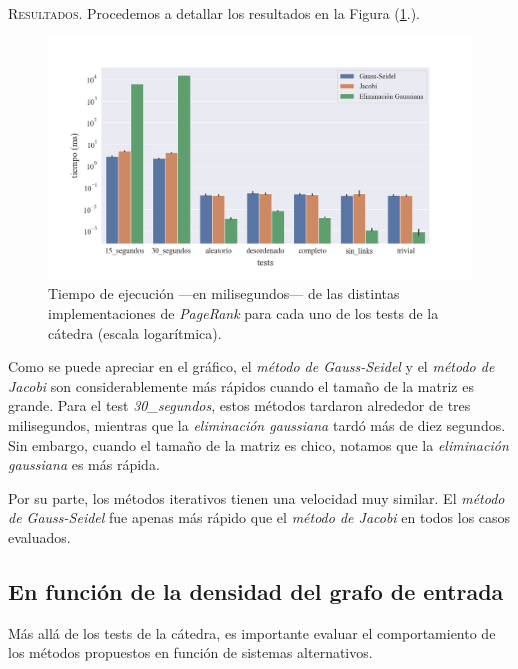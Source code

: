 \vspace{1.5em}
\noindent \textsc{Resultados}. Procedemos a detallar los resultados en la Figura (\ref{tiempo_ej}.). 

\begin{figure}[!htbp]
    \centering
    \includegraphics[width=.9\textwidth, trim=0 30 0 30]{files/src/.media/tiempo-ejecucion.png}
    \caption{Tiempo de ejecución ---en milisegundos--- de las distintas implementaciones de \textit{PageRank} para cada uno de los tests de la cátedra (escala logarítmica).} \label{tiempo_ej}
\end{figure}


\vspace{1em}
Como se puede apreciar en el gráfico, el \textit{método de Gauss-Seidel} y el \textit{método de Jacobi} son considerablemente más rápidos cuando el tamaño de la matriz es grande. Para el test \textit{30\_segundos}, estos métodos tardaron alrededor de tres milisegundos, mientras que la \textit{eliminación gaussiana} tardó más de diez segundos. Sin embargo, cuando el tamaño de la matriz es chico, notamos que la \textit{eliminación gaussiana} es más rápida. 

\vspace{1em}
Por su parte, los métodos iterativos tienen una velocidad muy similar. El \textit{método de Gauss-Seidel} fue apenas más rápido que el \textit{método de Jacobi} en todos los casos evaluados.

 



\vspace{2em}
\subsection{En función de la densidad del grafo de entrada}

Más allá de los tests de la cátedra, es importante evaluar el comportamiento de los métodos propuestos en función de sistemas alternativos.


